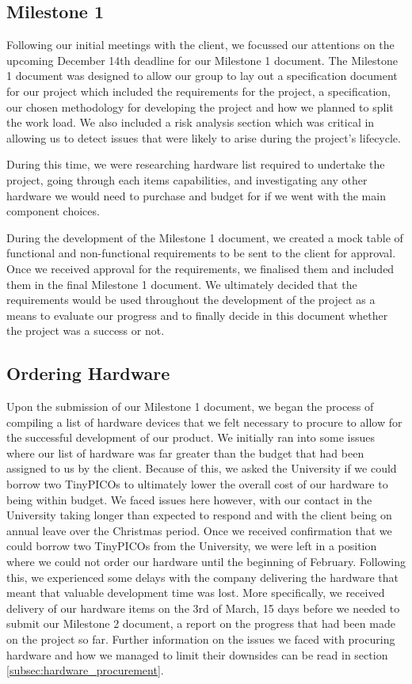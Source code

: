         \subsection{Milestone 1}

            Following our initial meetings with the client, we focussed our attentions on the upcoming December 14th deadline for our Milestone 1 document. The Milestone 1 document was designed to allow our group to lay out a specification document for our project which included the requirements for the project, a specification, our chosen methodology for developing the project and how we planned to split the work load. We also included a risk analysis section which was critical in allowing us to detect issues that were likely to arise during the project's lifecycle. 

            During this time, we were researching hardware list required to undertake the project, going through each items capabilities, and investigating any other hardware we would need to purchase and budget for if we went with the main component choices.

            During the development of the Milestone 1 document, we created a mock table of functional and non-functional requirements to be sent to the client for approval. Once we received approval for the requirements, we finalised them and included them in the final Milestone 1 document. We ultimately decided that the requirements would be used throughout the development of the project as a means to evaluate our progress and to finally decide in this document whether the project was a success or not.

        \subsection{Ordering Hardware}

            Upon the submission of our Milestone 1 document, we began the process of compiling a list of hardware devices that we felt necessary to procure to allow for the successful development of our product. We initially ran into some issues where our list of hardware was far greater than the budget that had been assigned to us by the client. Because of this, we asked the University if we could borrow two TinyPICOs to ultimately lower the overall cost of our hardware to being within budget. We faced issues here however, with our contact in the University taking longer than expected to respond and with the client being on annual leave over the Christmas period. Once we received confirmation that we could borrow two TinyPICOs from the University, we were left in a position where we could not order our hardware until the beginning of February. Following this, we experienced some delays with the company delivering the hardware that meant that valuable development time was lost. More specifically, we received delivery of our hardware items on the 3rd of March, 15 days before we needed to submit our Milestone 2 document, a report on the progress that had been made on the project so far. Further information on the issues we faced with procuring hardware and how we managed to limit their downsides can be read in section \ref{subsec:hardware_procurement}.

